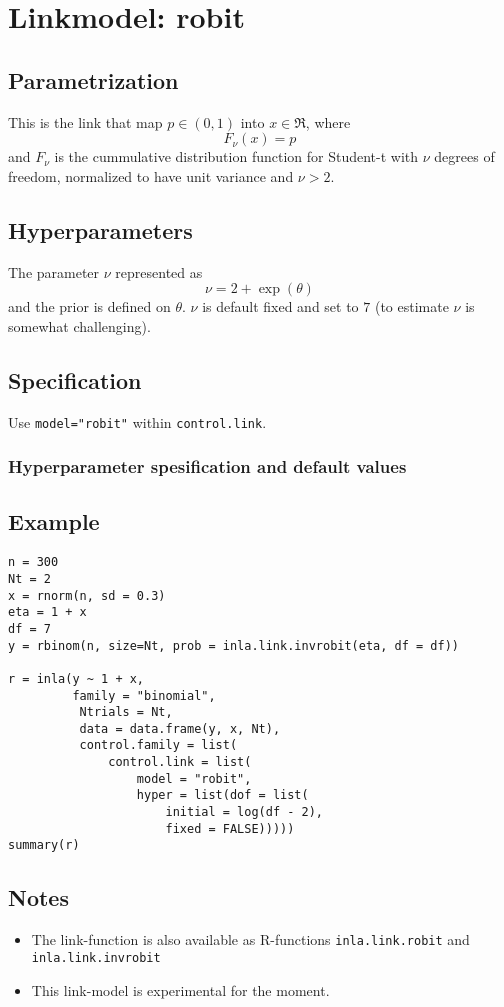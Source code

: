 \documentclass[a4paper,11pt]{article}
\begin{document}
\section*{Linkmodel: robit}

\subsection*{Parametrization}

This is the link that map $p\in (0,1)$ into $x\in\Re$, where
\begin{displaymath}
    F_{\nu}(x) = p
\end{displaymath}
and $F_{\nu}$ is the cummulative distribution function for Student-t
with $\nu$ degrees of freedom, normalized to have unit variance and
$\nu > 2$.

\subsection*{Hyperparameters}

The  parameter $\nu$ represented as
\begin{displaymath}
    \nu = 2 + \exp(\theta)
\end{displaymath}
and the prior is defined on $\theta$. $\nu$ is default fixed and set
to $7$ (to estimate $\nu$ is somewhat challenging).

\subsection*{Specification}

Use \texttt{model="robit"} within \texttt{control.link}.  

\subsubsection*{Hyperparameter spesification and default values}


\subsection*{Example}

\begin{verbatim}
n = 300
Nt = 2
x = rnorm(n, sd = 0.3)
eta = 1 + x
df = 7
y = rbinom(n, size=Nt, prob = inla.link.invrobit(eta, df = df))

r = inla(y ~ 1 + x,
         family = "binomial",
          Ntrials = Nt,
          data = data.frame(y, x, Nt),
          control.family = list(
              control.link = list(
                  model = "robit",
                  hyper = list(dof = list(
                      initial = log(df - 2), 
                      fixed = FALSE)))))
summary(r)
\end{verbatim}

\subsection*{Notes}

\begin{itemize}
\item The link-function is also available as R-functions
    \texttt{inla.link.robit} and \texttt{inla.link.invrobit}
\item This link-model is experimental for the moment.
\end{itemize}
\end{document}
